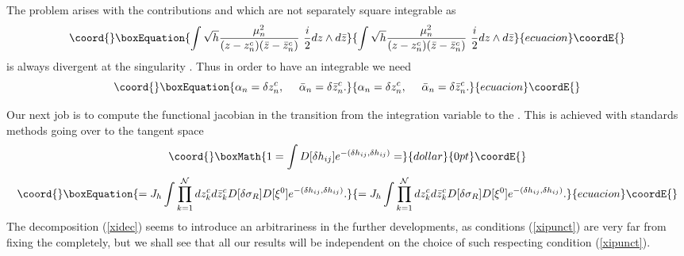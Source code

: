 \documentclass[a4paper,12pt]{article}
\begin{document}
The problem arises with the contributions
\coordHE{} and \coordHE{} which are not separately square integrable
as 
\begin{equation}\coord{}\boxEquation{
\int \sqrt h \frac{\mu_n^2}{(z-z^c_n)(\bar z -\bar
z^c_n)}~\frac{i}{2}dz\wedge d\bar z 
}{
\int \sqrt h \frac{\mu_n^2}{(z-z^c_n)(\bar z -\bar
z^c_n)}~\frac{i}{2}dz\wedge d\bar z 
}{ecuacion}\coordE{}\end{equation}
is always divergent at the singularity \coordHE{}.
Thus in order to have an integrable \coordHE{} we need
\begin{equation}\coord{}\boxEquation{
\alpha_n = \delta z^c_n,~~~~\bar\alpha_n = \delta \bar z^c_n.
}{
\alpha_n = \delta z^c_n,~~~~\bar\alpha_n = \delta \bar z^c_n.
}{ecuacion}\coordE{}\end{equation}

Our next job is to compute the functional jacobian in the transition
from the integration variable \coordHE{} to the \coordHE{}. This is achieved with standards methods going over to the
tangent space \cite{alvarez}
$$\coord{}\boxMath{
1=\int D[\delta h_{ij}]e^{-(\delta h_{ij}, \delta h_{ij} )}=
}{dollar}{0pt}\coordE{}$$
\begin{equation}\coord{}\boxEquation{
=J_h \int \prod_{k=1}^{\cal N} dz^c_k d \bar z^c_k  D[\delta
\sigma_R]D[\xi^0] 
e^{-( \delta h_{ij}, \delta h_{ij} ) }.
}{
=J_h \int \prod_{k=1}^{\cal N} dz^c_k d \bar z^c_k  D[\delta
\sigma_R]D[\xi^0] 
e^{-( \delta h_{ij}, \delta h_{ij} ) }.
}{ecuacion}\coordE{}\end{equation}
The decomposition (\ref{xidec}) seems to introduce an
arbitrariness in the further developments, as conditions (\ref{xipunct}) 
are very far from fixing the \coordHE{} completely, but we shall
see that all our results will be independent on the
choice of such \coordHE{} respecting condition (\ref{xipunct}).
\end{document}
